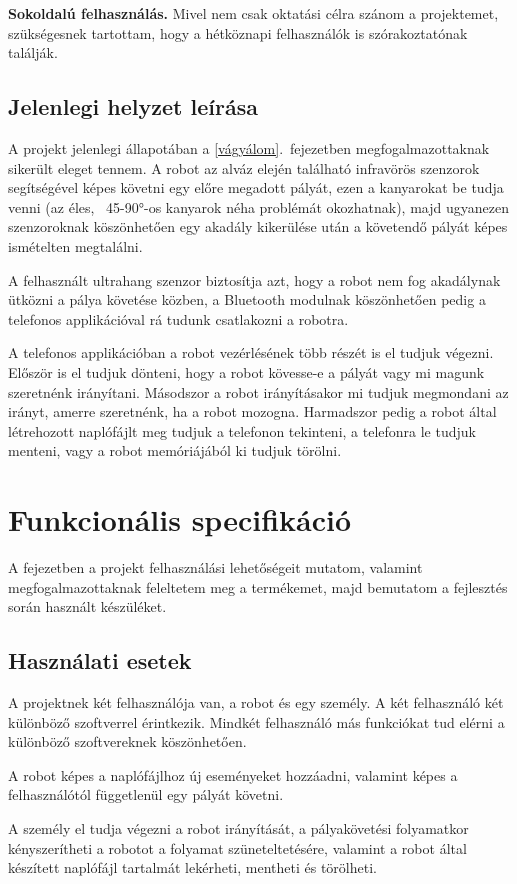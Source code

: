 \documentclass[]{thesis-ekf}
\theoremstyle{definition}
\begin{document}
\textbf{Sokoldalú felhasználás.} Mivel nem csak oktatási célra szánom a projektemet, szükségesnek tartottam, hogy a hétköznapi felhasználók is szórakoztatónak találják.
\section{Jelenlegi helyzet leírása}\label{jelenlegi_helyzet}
A projekt jelenlegi állapotában a \ref{vágyálom}.~fejezetben megfogalmazottaknak sikerült eleget tennem. A robot az alváz elején található infravörös szenzorok segítségével képes követni egy előre megadott pályát, ezen a kanyarokat be tudja venni (az éles, ~45-90°-os kanyarok néha problémát okozhatnak), majd ugyanezen szenzoroknak köszönhetően egy akadály kikerülése után a követendő pályát képes ismételten megtalálni.

A felhasznált ultrahang szenzor biztosítja azt, hogy a robot nem fog akadálynak ütközni a pálya követése közben, a Bluetooth modulnak köszönhetően pedig a telefonos applikációval rá tudunk csatlakozni a robotra.

A telefonos applikációban a robot vezérlésének több részét is el tudjuk végezni. Először is el tudjuk dönteni, hogy a robot kövesse-e a pályát vagy mi magunk szeretnénk irányítani. Másodszor a robot irányításakor mi tudjuk megmondani az irányt, amerre szeretnénk, ha a robot mozogna. Harmadszor pedig a robot által létrehozott naplófájlt meg tudjuk a telefonon tekinteni, a telefonra le tudjuk menteni, vagy a robot memóriájából ki tudjuk törölni.
\chapter{Funkcionális specifikáció}
A fejezetben a projekt felhasználási lehetőségeit mutatom, valamint   megfogalmazottaknak feleltetem meg a termékemet, majd bemutatom a fejlesztés során használt készüléket.
\section{Használati esetek}
A projektnek két felhasználója van, a robot és egy személy. A két felhasználó két különböző szoftverrel érintkezik. Mindkét felhasználó más funkciókat tud elérni a különböző szoftvereknek köszönhetően.

A robot képes a naplófájlhoz új eseményeket hozzáadni, valamint képes a felhasználótól függetlenül egy pályát követni.

A személy el tudja végezni a robot irányítását, a pályakövetési folyamatkor kényszerítheti a robotot a folyamat szüneteltetésére, valamint a robot által készített naplófájl tartalmát lekérheti, mentheti és törölheti.
\end{document}
